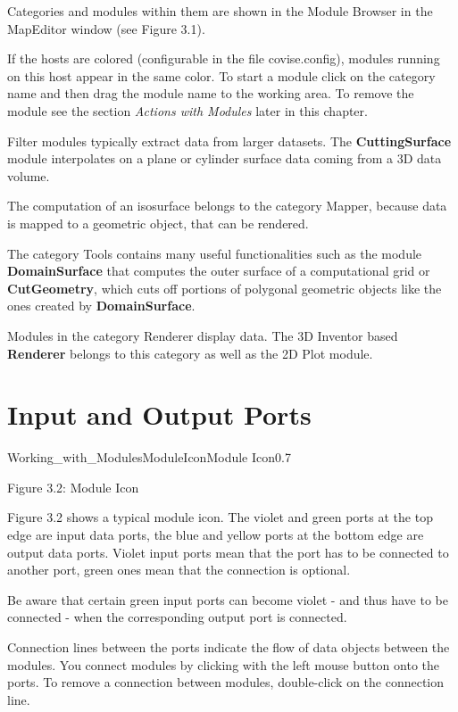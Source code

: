 Categories and modules within them are shown in the Module Browser in the MapEditor 
window (see Figure 3.1).

If the hosts are colored (configurable in the file covise.config), modules running on 
this host appear in the same color. To start a module click on the category name and then 
drag the module name to the working area. To remove the module see the section 
\emph{Actions with Modules} later in this chapter.

Filter modules typically extract data from larger datasets. The {\bf CuttingSurface} module 
interpolates on a plane or cylinder surface data coming from a 3D data volume.

The computation of an isosurface belongs to the category Mapper, because data is mapped 
to a geometric object, that can be rendered. 

The category Tools contains many useful functionalities such as the module {\bf DomainSurface} 
that computes the outer surface of a computational grid or {\bf CutGeometry}, which cuts 
off portions of polygonal geometric objects like the ones created by {\bf DomainSurface}. 

Modules in the category Renderer display data. The 3D Inventor based {\bf Renderer} belongs
to this category as well as the 2D Plot module.

\section{Input and Output Ports}

\begin{covimg}{Working_with_Modules}{ModuleIcon}{Module Icon}{0.7}\end{covimg}
\begin{htmlonly}
Figure 3.2: Module Icon
\vspace{0.5cm}
\end{htmlonly}


Figure 3.2 shows a typical module icon. The violet and green ports at the top edge are 
input data ports, the blue and yellow ports at the bottom edge are output data ports. 
Violet input ports mean that the port has to be connected to another port, green ones 
mean that the connection is optional.

Be aware that certain green input ports can become violet - and thus have to be connected - when the corresponding
output port is connected.

Connection lines between the ports indicate the flow of data objects between the modules. 
You connect modules by clicking with the left mouse button onto the ports. To remove a 
connection between modules, double-click on the connection line.


